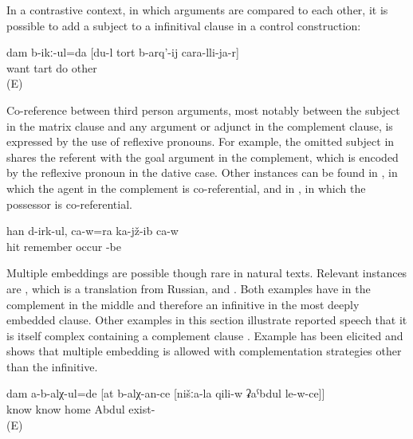 In a contrastive context, in which arguments are compared to each other, it is possible to add a subject to a infinitival clause in a control construction:
%
\begin{exe}
	\ex	\label{ex:‎I want to make the tart than another person}
	\gll	dam	b-ikː-ul=da	[du-l	tort	b-arq'-ij	cara-lli-ja-r]\\
			want		tart do	other\\
	\glt	{} (E)
\end{exe}

Co-reference between third person arguments, most notably between the subject in the matrix clause and any argument or adjunct in the complement clause, is expressed by the use of reflexive pronouns. For example, the omitted subject in  shares the referent with the goal argument in the complement, which is encoded by the reflexive pronoun in the dative case. Other instances can be found in , in which the agent in the complement is co-referential, and in , in which the possessor is co-referential.
%
\begin{exe}
	\ex	\label{ex:He is sitting and remembering how (they) beat him up}
	\gll	[cini-j	d-aˁq-ib-te=ra]	han	d-irk-ul,	ca-w=ra	ka-jž-ib	ca-w\\
		 hit	remember	occur		-be	\\
	\glt	{}
\end{exe}

Multiple embeddings are possible though rare in natural texts. Relevant instances are , which is a translation from Russian, and . Both examples have  in the complement in the middle and therefore an infinitive in the most deeply embedded clause. Other examples in this section illustrate reported speech that it is itself complex containing a complement clause . Example  has been elicited and shows that multiple embedding is allowed with complementation strategies other than the infinitive.
%
\begin{exe}
	\ex	\label{ex:‎‎‎I did not know that you know that Abdul was at our place}
	\gll	dam	a-b-alχ-ul=de	[at	b-alχ-an-ce	[nišːa-la	qili-w	ʡaˁbdul	le-w-ce]]\\
			know		know		home	Abdul	exist-\\
	\glt	{} (E)
\end{exe}

